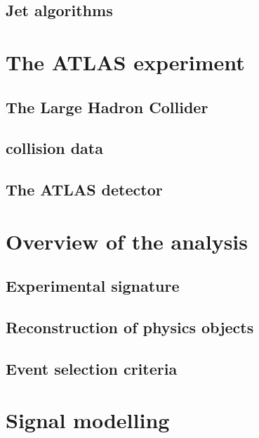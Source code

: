 \documentclass[hyper,linkcolor=blue]{mythesis}
\begin{document}
\begin{mainmatter}
    \section{Jet algorithms}
      \label{sec:jets}
      

  \chapter{The ATLAS experiment}
    \label{chap:experiment}
    
    \section{The Large Hadron Collider}
      \label{sec:lhc}
      
    \section{\pp collision data}
      \label{sec:dataset}
      
    \section{The ATLAS detector}
      \label{sec:atlas}
      
  
  \chapter{Overview of the \HWW analysis}
    \label{chap:selection}
    
    \section{Experimental signature}
      \label{sec:signature}
      
    \section{Reconstruction of physics objects}
      \label{sec:objects}
      
    \clearpage
    \section{Event selection criteria}
      \label{sec:selection}
      

  \chapter{Signal modelling}
    \label{chap:signal}
    

\end{mainmatter}
\end{document}
